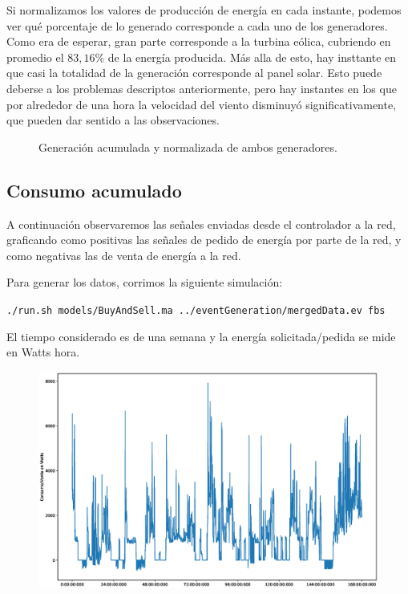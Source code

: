 Si normalizamos los valores de producción de energía en cada instante,
podemos ver qué porcentaje de lo generado corresponde a cada uno de los
generadores. Como era de esperar, gran parte corresponde a la turbina
eólica, cubriendo en promedio el \(83,16\%\) de la energía producida.
Más alla de esto, hay insttante en que casi la totalidad de la
generación corresponde al panel solar. Esto puede deberse a los
problemas descriptos anteriormente, pero hay instantes en los que por
alrededor de una hora la velocidad del viento disminuyó
significativamente, que pueden dar sentido a las observaciones.

\begin{figure}
    \begin{center}
    \end{center}
    \caption{Generación acumulada y normalizada de ambos generadores.}
\end{figure}

\subsection{Consumo acumulado}
A continuación observaremos las señales enviadas desde el controlador a la red, graficando
como positivas las señales de pedido de energía por parte de la red, y como negativas las
de venta de energía a la red.

Para generar los datos, corrimos la siguiente simulación:

{\tt ./run.sh models/BuyAndSell.ma ../eventGeneration/mergedData.ev fbs}

El tiempo considerado es de una semana y la energía solicitada/pedida se mide en Watts hora.
 
\begin{figure}[H]
    \centering
    \includegraphics[scale=0.3]{images/cons.eps}
\end{figure}

